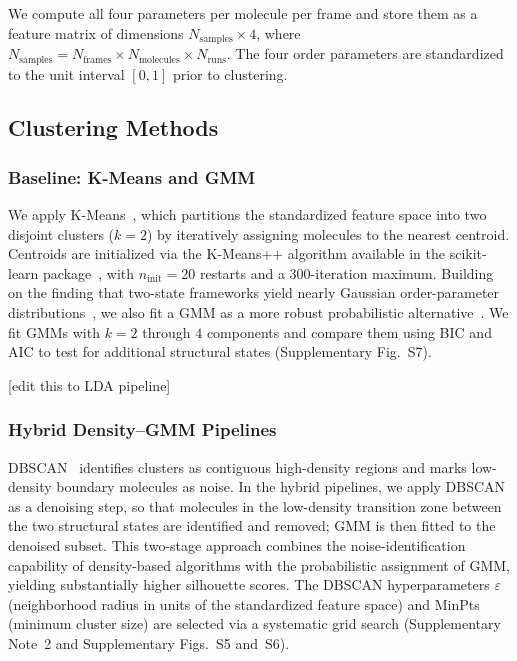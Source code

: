 \documentclass[aps, amsmath,amssymb, reprint, twocolumn, superscriptaddress]{revtex4-2}
\begin{document}
We compute all four parameters per molecule per frame and store them as a feature matrix of dimensions $N_{\text{samples}} \times 4$, where $N_{\text{samples}} = N_{\text{frames}} \times N_{\text{molecules}} \times N_{\text{runs}}$. The four order parameters are standardized to the unit interval $[0,1]$ prior to clustering.

\subsection{Clustering Methods}
\label{sec:clustering_algorithm}

\subsubsection{Baseline: K-Means and GMM}
We apply K-Means~\cite{ikotun_k-means_2023}, which partitions the standardized feature space into two disjoint clusters ($k=2$) by iteratively assigning molecules to the nearest centroid. Centroids are initialized via the K-Means++ algorithm available in the scikit-learn package~\cite{scikit-learn}, with $n_{\text{init}} = 20$ restarts and a 300-iteration maximum. Building on the finding that two-state frameworks yield nearly Gaussian order-parameter distributions~\cite{shi_direct_2020}, we also fit a GMM as a more robust probabilistic alternative~\cite{deprez-2024}. We fit GMMs with $k = 2$ through $4$ components and compare them using BIC and AIC to test for additional structural states (Supplementary Fig.~S7).

[edit this to LDA pipeline]
\subsubsection{Hybrid Density--GMM Pipelines}
DBSCAN~\cite{ester_density-based_1996} identifies clusters as contiguous high-density regions and marks low-density boundary molecules as noise. In the hybrid pipelines, we apply DBSCAN as a denoising step, so that molecules in the low-density transition zone between the two structural states are identified and removed; GMM is then fitted to the denoised subset. This two-stage approach combines the noise-identification capability of density-based algorithms with the probabilistic assignment of GMM, yielding substantially higher silhouette scores. The DBSCAN hyperparameters $\varepsilon$ (neighborhood radius in units of the standardized feature space) and MinPts (minimum cluster size) are selected via a systematic grid search (Supplementary Note~2 and Supplementary Figs.~S5 and~S6).
\end{document}
